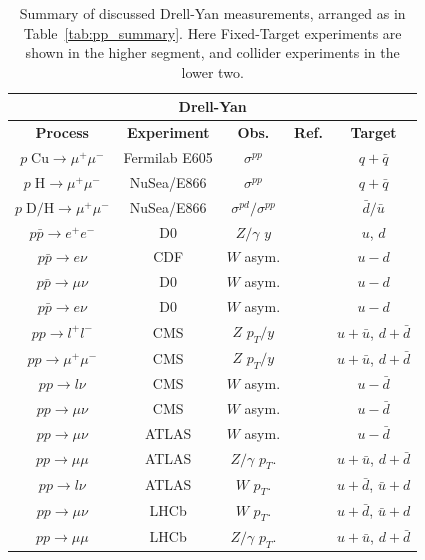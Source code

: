 \documentclass[12pt,twoside,openright]{report}
\begin{document}
\begin{spacing}{1.5}
\begin{table}
\begin{center}
\begin{tabular}{|c|c|c|c|c|}
\hline
\multicolumn{5}{|c|}{\textbf{Drell-Yan}}\\
\hline
\textbf{Process} & \textbf{Experiment} & \textbf{Obs.} &\textbf{Ref.} &  \textbf{Target} \\
\hline\hline
$p\; \mathrm{ Cu} \to \mu^+ \mu^- $ & Fermilab E605 & $\sigma^{pp}$ & \cite{Moreno:1990sf} & $q+\bar{q}$\\
\hline
$p\; \mathrm{ H} \to \mu^+ \mu^- $ & NuSea/E866 & $\sigma^{pp}$ & \cite{Webb:2003bj}&  $q+\bar{q}$\\
$p\; \mathrm{ D/H} \to \mu^+ \mu^- $ & NuSea/E866 & $\sigma^{pd}/\sigma^{pp}$ & \cite{Towell:2001nh}& $\bar{d}/\bar{u}$ \\
\hline
\hline
$p\bar{p} \to e^+ e^- $ & D0 & $Z/\gamma$ $y$ & \cite{Abazov:2007jy}& $u$, $d$ \\
$p\bar{p} \to e \nu $ & CDF & $W$ asym. & \cite{Acosta:2005ud}& $u-d$  \\
$p\bar{p} \to \mu \nu $ & D0 & $W$ asym. & \cite{Abazov:2007pm}&  $u-d$ \\
$p\bar{p} \to e \nu $ & D0 & $W$ asym. & \cite{Abazov:2008qv}& $u-d$  \\
\hline
\hline
$pp \to l^+ l^- $ & CMS & $Z$ $p_T/y$ & \cite{Chatrchyan:2011wt}& $u + \bar{u}$, $d + \bar{d}$ \\
$pp \to \mu^+ \mu^- $ & CMS & $Z$ $p_T/y$ & \cite{CMS-PAS-SMP-12-025,CMS-PAS-SMP-13-013}&  $u + \bar{u}$, $d + \bar{d}$\\
$pp \to l \nu $ & CMS & $W$ asym. & \cite{Chatrchyan:2011jz}&  $u-\bar{d}$\\
$pp \to \mu \nu $ & CMS & $W$ asym. & \cite{Chatrchyan:2012xt,Chatrchyan:2013mza} & $u-\bar{d}$ \\
\hline
$pp \to \mu  \nu $ & ATLAS & $W$ asym. & \cite{Aad:2011yna} &  $u-\bar{d}$\\
$pp \to \mu  \mu $ & ATLAS & $Z/\gamma$ $p_T$. & \cite{Aad:2011gj}&  $u + \bar{u}$, $d + \bar{d}$\\
$pp \to l  \nu $ & ATLAS & $W$ $p_T$. & \cite{Aad:2011fp} & $u+\bar{d}$, $\bar{u} + d$  \\
\hline
$pp \to \mu  \nu $ & LHCb & $W$ $p_T$. & \cite{Aaij:2012vn} &  $u+\bar{d}$, $\bar{u} + d$\\
$pp \to \mu  \mu $ & LHCb & $Z/\gamma$ $p_T$. & \cite{Aaij:2012vn}& $u + \bar{u}$, $d + \bar{d}$ \\
\hline
\end{tabular}
\end{center}
\caption{Summary of discussed Drell-Yan measurements, arranged as in Table~\ref{tab:pp_summary}. Here Fixed-Target experiments are shown in the higher segment, and collider experiments in the lower two.}
\label{tab:FTDY_summary}
\end{table}%


\end{spacing}
\end{document}
